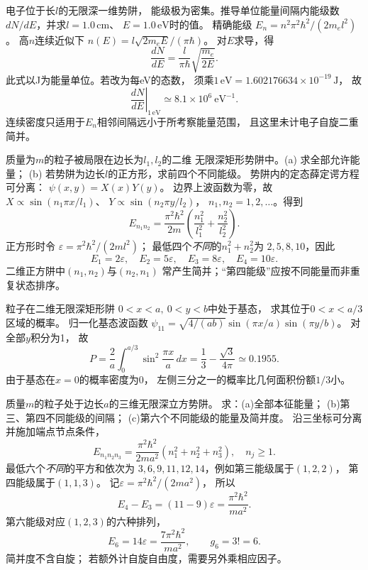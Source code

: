 电子位于长$l$的无限深一维势阱，
能级极为密集。推导单位能量间隔内能级数
$dN/dE$，并求$l=1.0\,\mathrm{cm}$、
$E=1.0\,\mathrm{eV}$时的值。
\exsolution
精确能级
$E_n=n^2\pi^2\hbar^2/(2m_el^2)$。
高$n$连续近似下
$n(E)=l\sqrt{2m_eE}/(\pi\hbar)$。
对$E$求导，得
\[
 \boxed{\frac{dN}{dE}=\frac l{\pi\hbar}
 \sqrt{\frac{m_e}{2E}}}.
\]
此式以J为能量单位。若改为每eV的态数，
须乘$1\,\mathrm{eV}=1.602176634\times10^{-19}\,\mathrm J$，
故
\[
 \boxed{\left.\frac{dN}{dE}\right|_{1\,\mathrm{eV}}
 \simeq8.1\times10^6\ \mathrm{eV^{-1}}}.
\]
\excheck 连续密度只适用于$E_n$相邻间隔远小于所考察能量范围，
且这里未计电子自旋二重简并。

质量为$m$的粒子被局限在边长为$l_1,l_2$的二维
无限深矩形势阱中。(a) 求全部允许能量；
(b) 若势阱为边长$l$的正方形，求前四个不同能级。
\exsolution
势阱内的定态薛定谔方程可分离：
$\psi(x,y)=X(x)Y(y)$。
边界上波函数为零，故
$X\propto\sin(n_1\pi x/l_1)$、
$Y\propto\sin(n_2\pi y/l_2)$，
$n_1,n_2=1,2,\ldots$。得到
\[
 \boxed{E_{n_1n_2}=\frac{\pi^2\hbar^2}{2m}
 \left(\frac{n_1^2}{l_1^2}+\frac{n_2^2}{l_2^2}\right)}.
\]
正方形时令
$\varepsilon=\pi^2\hbar^2/(2ml^2)$；
最低四个\emph{不同}的$n_1^2+n_2^2$为
$2,5,8,10$，因此
\[
 \boxed{E_1=2\varepsilon,\quad E_2=5\varepsilon,\quad
 E_3=8\varepsilon,\quad E_4=10\varepsilon}.
\]
\excheck 二维正方阱中$(n_1,n_2)$与$(n_2,n_1)$
常产生简并；“第四能级”应按不同能量而非重复状态排序。

粒子在二维无限深矩形阱
$0<x<a,\ 0<y<b$中处于基态，
求其位于$0<x<a/3$区域的概率。
\exsolution
归一化基态波函数
$\psi_{11}=\sqrt{4/(ab)}
\sin(\pi x/a)\sin(\pi y/b)$。
对全部$y$积分为1，
故
\[
 P=\frac2a\int_0^{a/3}\sin^2\frac{\pi x}{a}\,dx
 =\boxed{\frac13-\frac{\sqrt3}{4\pi}
 \simeq0.1955}.
\]
\excheck 由于基态在$x=0$的概率密度为0，
左侧三分之一的概率比几何面积份额$1/3$小。

质量$m$的粒子处于边长$a$的三维无限深立方势阱。
求：(a)全部本征能量；
(b)第三、第四不同能级的间隔；
(c)第六个不同能级的能量及简并度。
\exsolution
沿三坐标可分离并施加端点节点条件，
\[
 \boxed{E_{n_1n_2n_3}=
 \frac{\pi^2\hbar^2}{2ma^2}
 (n_1^2+n_2^2+n_3^2)},\quad n_j\ge1.
\]
最低六个\emph{不同}的平方和依次为
$3,6,9,11,12,14$，例如第三能级属于$(1,2,2)$，
第四能级属于$(1,1,3)$。
记$\varepsilon=\pi^2\hbar^2/(2ma^2)$，
所以
\[
 \boxed{E_4-E_3=(11-9)\varepsilon
 =\frac{\pi^2\hbar^2}{ma^2}}.
\]
第六能级对应$(1,2,3)$的六种排列，
\[
 \boxed{E_6=14\varepsilon=\frac{7\pi^2\hbar^2}{ma^2}},
 \qquad \boxed{g_6=3!=6}.
\]
\excheck 简并度不含自旋；
若额外计自旋自由度，需要另外乘相应因子。

